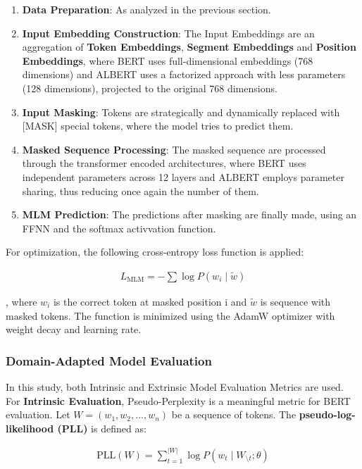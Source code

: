 \documentclass[a4paper,12pt]{article}
\begin{document}
\begin{enumerate}
    \item \textbf{Data Preparation}: As analyzed in the previous section.
    \item \textbf{Input Embedding Construction}: The Input Embeddings are an aggregation of \textbf{Token Embeddings}, \textbf{Segment Embeddings} and \textbf{Position Embeddings}, where BERT uses full-dimensional embeddings (768 dimensions) and ALBERT uses a factorized approach with less parameters (128 dimensions), projected to the original 768 dimensions.
    \item \textbf{Input Masking}: Tokens are strategically and dynamically replaced with [MASK] special tokens, where the model tries to predict them. 
    \item \textbf{Masked Sequence Processing}: The masked sequence are processed through the transformer encoded architectures, where BERT uses independent parameters across 12 layers and ALBERT employs parameter sharing, thus reducing once again the number of them.
    \item \textbf{MLM Prediction}: The predictions after masking are finally made, using an FFNN and the softmax activvation function. 
\end{enumerate}

For optimization, the following cross-entropy loss function is applied:

\begin{align}
L_{\text{MLM}} = - \sum \log P(w_i \mid \tilde{w})
\end{align}

 , where $w_i$ is the correct token at masked position i and $\tilde{w}$ is sequence with masked tokens. The function is minimized using the AdamW optimizer with weight decay and learning rate.

\subsubsection{Domain-Adapted Model Evaluation}
In this study, both Intrinsic and Extrinsic Model Evaluation Metrics are used. For \textbf{Intrinsic Evaluation}, Pseudo-Perplexity is a meaningful metric for BERT evaluation. Let $W=(w_1,w_2,...,w_n)$ be a sequence of tokens. The \textbf{pseudo-log-likelihood (PLL)} is defined as:

\begin{align}
\text{PLL}(W) = \sum_{t=1}^{|W|} \log P(w_t \mid W_{\setminus t}; \theta)
\end{align}
\end{document}
